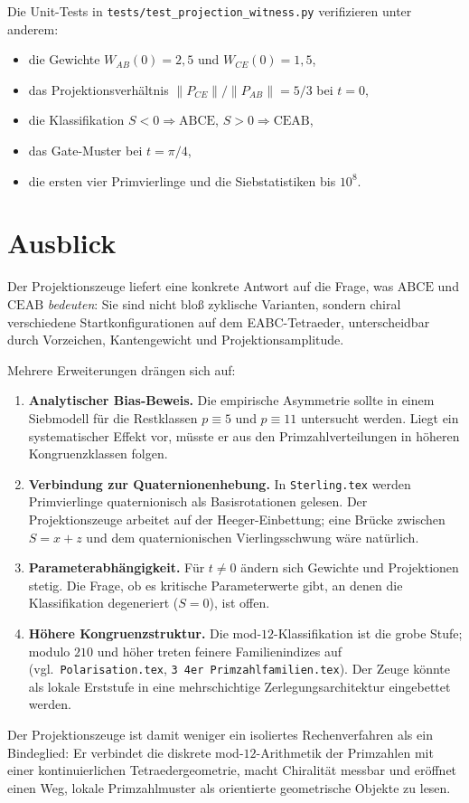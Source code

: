\documentclass[11pt,a4paper]{article}
\theoremstyle{definition}
\theoremstyle{plain}
\begin{document}
	Die Unit-Tests in \texttt{tests/test\_projection\_witness.py} verifizieren unter anderem:
	\begin{itemize}
		\item die Gewichte $W_{AB}(0)=2{,}5$ und $W_{CE}(0)=1{,}5$,
		\item das Projektionsverhältnis $\|P_{CE}\|/\|P_{AB}\|=5/3$ bei $t=0$,
		\item die Klassifikation $S<0\Rightarrow\mathrm{ABCE}$, $S>0\Rightarrow\mathrm{CEAB}$,
		\item das Gate-Muster bei $t=\pi/4$,
		\item die ersten vier Primvierlinge und die Siebstatistiken bis $10^8$.
	\end{itemize}
	
	\section{Ausblick}
	
	Der Projektionszeuge liefert eine konkrete Antwort auf die Frage, was $\mathrm{ABCE}$ und $\mathrm{CEAB}$ \emph{bedeuten}: Sie sind nicht bloß zyklische Varianten, sondern chiral verschiedene Startkonfigurationen auf dem EABC-Tetraeder, unterscheidbar durch Vorzeichen, Kantengewicht und Projektionsamplitude.
	
	Mehrere Erweiterungen drängen sich auf:
	
	\begin{enumerate}[label=\arabic*.]
		\item \textbf{Analytischer Bias-Beweis.} Die empirische Asymmetrie sollte in einem Siebmodell für die Restklassen $p\equiv 5$ und $p\equiv 11$ untersucht werden. Liegt ein systematischer Effekt vor, müsste er aus den Primzahlverteilungen in höheren Kongruenzklassen folgen.
		\item \textbf{Verbindung zur Quaternionenhebung.} In \texttt{Sterling.tex} werden Primvierlinge quaternionisch als Basisrotationen gelesen. Der Projektionszeuge arbeitet auf der Heeger-Einbettung; eine Brücke zwischen $S=x+z$ und dem quaternionischen Vierlingsschwung wäre natürlich.
		\item \textbf{Parameterabhängigkeit.} Für $t\neq 0$ ändern sich Gewichte und Projektionen stetig. Die Frage, ob es kritische Parameterwerte gibt, an denen die Klassifikation degeneriert ($S=0$), ist offen.
		\item \textbf{Höhere Kongruenzstruktur.} Die mod-$12$-Klassifikation ist die grobe Stufe; modulo $210$ und höher treten feinere Familienindizes auf (vgl.\ \texttt{Polarisation.tex}, \texttt{3 4er Primzahlfamilien.tex}). Der Zeuge könnte als lokale Erststufe in eine mehrschichtige Zerlegungsarchitektur eingebettet werden.
	\end{enumerate}
	
	Der Projektionszeuge ist damit weniger ein isoliertes Rechenverfahren als ein Bindeglied: Er verbindet die diskrete mod-$12$-Arithmetik der Primzahlen mit einer kontinuierlichen Tetraedergeometrie, macht Chiralität messbar und eröffnet einen Weg, lokale Primzahlmuster als orientierte geometrische Objekte zu lesen.
	
\end{document}
